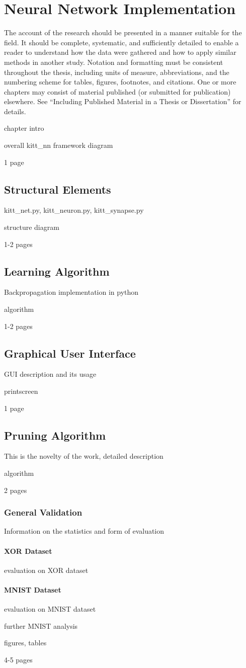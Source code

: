 \chapter{Neural Network Implementation}
\label{chapter:04:neural_net_implementation}

The account of the research should be presented in a manner suitable for the field. It should be complete, systematic, and sufficiently detailed to enable a reader to understand how the data were gathered and how to apply similar methods in another study. Notation and formatting must be consistent throughout the thesis, including units of measure, abbreviations, and the numbering scheme for tables, figures, footnotes, and citations. One or more chapters may consist of material published (or submitted for publication) elsewhere. See “Including Published Material in a Thesis or Dissertation” for details.

chapter intro

overall kitt\_nn framework diagram

1 page

\section{Structural Elements}
kitt\_net.py, kitt\_neuron.py, kitt\_synapse.py

structure diagram

1-2 pages

\section{Learning Algorithm}
Backpropagation implementation in python

algorithm

1-2 pages

\section{Graphical User Interface}
GUI description and its usage

printscreen

1 page

\section{Pruning Algorithm}
This is the novelty of the work, detailed description

algorithm

2 pages

\subsection{General Validation}
Information on the statistics and form of evaluation

\subsubsection*{XOR Dataset}
evaluation on XOR dataset

\subsubsection*{MNIST Dataset}
evaluation on MNIST dataset

further MNIST analysis

figures, tables

4-5 pages
